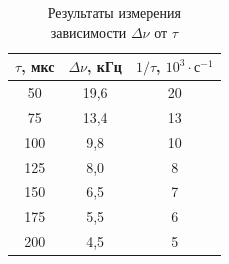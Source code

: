 \documentclass[a4paper, 12pt]{article}
\begin{document}
    \begin{table}[H]
        \centering
        \begin{tabular}{|c|c|c|}
        \hline
        $\tau$, мкс & $\Delta \nu$, кГц & $1/\tau$, $10^3 \cdot \text{с}^{-1}$  \\ \hline
        50 & 19,6 & 20 \\ \hline
        75 & 13,4 & 13 \\ \hline
        100 & 9,8 & 10 \\ \hline
        125 & 8,0 & 8 \\ \hline
        150 & 6,5 & 7 \\ \hline
        175 & 5,5 & 6 \\ \hline
        200 & 4,5 & 5 \\ \hline
        \end{tabular}
        \caption{Результаты измерения зависимости $\Delta \nu$ от $\tau$}
        \label{nu_tau}
    \end{table}
\end{document}
